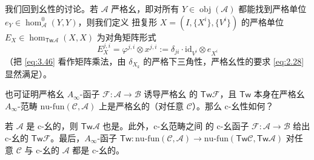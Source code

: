 我们回到幺性的讨论。若 $\mathcal A$ 严格幺，即对所有 $Y\in\operatorname{obj}
(\mathcal A)$ 都能找到严格单位 $e_Y\in\hom^0_{\mathcal A}(Y,Y)$，则我们定义
扭复形 $X=(I,\{X^i\},\{V^i\})$ 的严格单位
$E_X\in\hom_{\mathsf{Tw}\mathcal A}(X,X)$ 为对角矩阵形式
\[
  E_X^{j,i}=\varphi^{j,i}\otimes x^{j,i}:=\delta_{ji}\cdot\mathrm{id}_{V^i}
  \otimes e_{X^i}
\]
（把 \eqref{eq:3.46} 看作矩阵乘法，由 $\delta_{X_k}$ 的严格下三角性，严格幺性的要求
\eqref{eq:2.28} 显然满足）。

也可证明严格幺 $A_\infty$-函子 $\mathcal F:\mathcal A\to\mathcal B$ 诱导严格幺
的 $\mathsf{Tw}\mathcal F$，且 $\mathsf{Tw}$ 本身在严格幺 $A_\infty$-范畴
$\mathrm{nu\text{-}fun}(\mathcal C,\mathcal A)$ 上是严格幺的（对任意
$\mathcal C$）。那么 c-幺性如何？

\begin{Lem}\label{lem:3.31}
若 $\mathcal A$ 是 c-幺的，则 $\mathsf{Tw}\mathcal A$ 也是。此外，c-幺范畴之间
的 c-幺函子 $\mathcal F:\mathcal A\to\mathcal B$ 给出 c-幺的
$\mathsf{Tw}\mathcal F$。最后，$A_\infty$-函子
$\mathsf{Tw}:\mathrm{nu\text{-}fun}(\mathcal C,\mathcal A)\to
\mathrm{nu\text{-}fun}(\mathsf{Tw}\mathcal C,\mathsf{Tw}\mathcal A)$ 对任意
$\mathcal C$ 与 c-幺的 $\mathcal A$ 都是 c-幺的。
\end{Lem}

